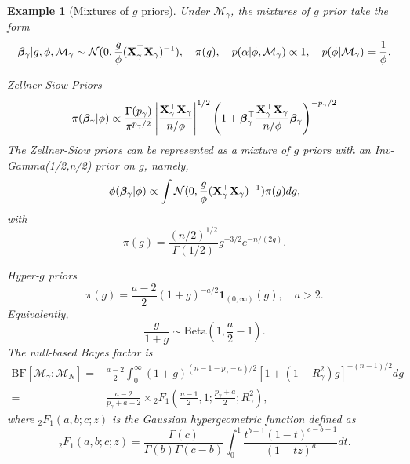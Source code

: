 \documentclass[11pt]{article}
\newcommand{\bfsym}[1]{\ensuremath{\boldsymbol{#1}}}
\def\bbeta{\bfsym \beta}
\theoremstyle{plain}
\newtheorem{example}{Example}
\theoremstyle{definition}
\theoremstyle{remark}
\begin{document}
\begin{example}[Mixtures of $g$ priors]
Under $\mathcal M_\gamma$, the mixtures of $g$ prior take the form
\begin{equation*}
    \bbeta_{\gamma}|g, \phi,\mathcal M_\gamma \sim \mathcal N (0,\frac{g}{\phi} (\BX_{\gamma}^\top \BX_{\gamma})^{-1}),
    \quad \pi(g),
    \quad p(\alpha|\phi,\mathcal M_\gamma)\propto 1,
    \quad p(\phi|\mathcal M_\gamma) = \frac{1}{\phi}.
\end{equation*}

\emph{Zellner-Siow Priors}
\begin{equation*}
    \pi(\bbeta_\gamma | \phi)
    \propto
    \frac{\Gamma(p_{\gamma})}{\pi^{p_\gamma/2}}
    \left|
    \frac{\BX_\gamma^\top \BX_\gamma}{n/\phi}
    \right|^{1/2}
    \left(
        1+\bbeta_\gamma^\top \frac{\BX_\gamma^\top \BX_\gamma}{n/\phi}   \bbeta_\gamma
    \right)^{-p_\gamma/2}
\end{equation*}
The Zellner-Siow priors can be represented as a mixture of $g$ priors with an Inv-Gamma(1/2,n/2) prior on $g$, namely,
\begin{equation*}
    \phi(\bbeta_\gamma|\phi)
    \propto
    \int \mathcal N (0,\frac{g}{\phi} (\BX_{\gamma}^\top \BX_{\gamma})^{-1}) \pi(g) dg,
\end{equation*}
with
\begin{equation*}
    \pi(g)=\frac{(n/2)^{1/2}}{\Gamma(1/2)} g^{-3/2} e^{-n/(2g)}.
\end{equation*}

\emph{Hyper-$g$ priors}
\begin{equation*}
    \pi(g)=\frac{a-2}{2} (1+g)^{-a/2}\mathbf{1}_{(0,\infty)}(g),\quad a>2.
\end{equation*}
Equivalently,
\begin{equation*}
    \frac{g}{1+g} \sim \text{Beta} (1,\frac{a}{2}-1).
\end{equation*}
The null-based Bayes factor is
\begin{equation*}
    \begin{split}
    \text{BF}[\mathcal M_\gamma : \mathcal M_N]=
&
\frac{a-2}{2}\int_{0}^\infty (1+g)^{(n-1-p_\gamma -a)/2} [1+(1-R^2_\gamma)g]^{-(n-1)/2} dg
\\
=&
\frac{a-2}{p_\gamma + a-2}
\times
{}_2 F_1
\left(
    \frac{n-1}{2}, 1;
    \frac{p_\gamma+a}{2};
    R^2_\gamma
\right),
\end{split}
\end{equation*}
where ${}_2 F_1 (a,b;c;z)$ is the Gaussian hypergeometric function defined as
\begin{equation*}
    {}_2 F_1 (a,b;c;z)
    =\frac{\Gamma(c)}{\Gamma(b) \Gamma(c-b)}
    \int_0^1
    \frac{t^{b-1}(1-t)^{c-b-1}}{(1-tz)^a}
    dt.
\end{equation*}


\end{example}
\end{document}
